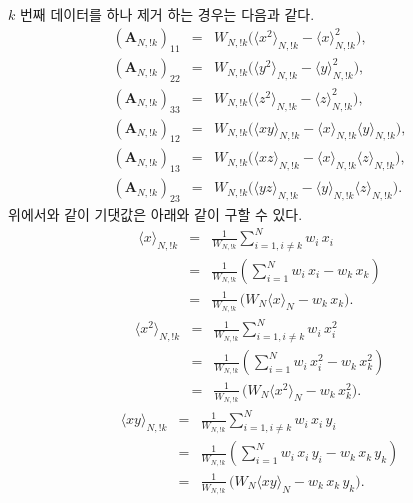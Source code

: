 \documentclass[chapter,a4paper,10pt]{oblivoir}
\begin{document}
$k$ 번째 데이터를 하나 제거 하는 경우는 다음과 같다.
\begin{eqnarray}
\left(\mathbf{A}_{N,!k}\right)_{11} &=& W_{N,!k}\Big(\langle x^2 \rangle_{N,!k} -\langle x \rangle_{N,!k}^2\Big), \\
\left(\mathbf{A}_{N,!k}\right)_{22} &=& W_{N,!k}\Big(\langle y^2 \rangle_{N,!k} -\langle y \rangle_{N,!k}^2\Big), \\
\left(\mathbf{A}_{N,!k}\right)_{33} &=& W_{N,!k}\Big(\langle z^2 \rangle_{N,!k} -\langle z \rangle_{N,!k}^2\Big), \\
\left(\mathbf{A}_{N,!k}\right)_{12} &=& W_{N,!k} \Big(\langle xy \rangle_{N,!k} -\langle x \rangle_{N,!k}\langle y \rangle_{N,!k}\Big), \\
\left(\mathbf{A}_{N,!k}\right)_{13} &=& W_{N,!k} \Big(\langle xz \rangle_{N,!k} -\langle x \rangle_{N,!k}\langle z \rangle_{N,!k}\Big), \\
\left(\mathbf{A}_{N,!k}\right)_{23} &=& W_{N,!k} \Big(\langle yz \rangle_{N,!k} -\langle y \rangle_{N,!k}\langle z \rangle_{N,!k}\Big).
\end{eqnarray}
위에서와 같이 기댓값은 아래와 같이 구할 수 있다.
\begin{eqnarray}
\langle x \rangle_{N,!k} &=& \frac{1}{W_{N,!k}}\sum_{i=1, i\neq k}^{N}w_i\,x_i \\
&=& \frac{1}{W_{N,!k}}\left(\sum_{i=1}^{N}w_i\,x_i - w_{k}\,x_{k}\right)\nonumber\\
&=& \frac{1}{W_{N,!k}}\,\Big(W_N\langle x \rangle_N - w_{k}\,x_{k}\Big).\nonumber
\end{eqnarray}
\begin{eqnarray}
\langle x^2 \rangle_{N,!k} &=& \frac{1}{W_{N,!k}}\sum_{i=1, i\neq k}^{N}w_i\,x_i^2 \\
&=& \frac{1}{W_{N,!k}}\left(\sum_{i=1}^{N}w_i\,x_i^2 - w_{k}\,x_{k}^2\right)\nonumber\\
&=& \frac{1}{W_{N,!k}}\,\Big(W_N\langle x^2 \rangle_N - w_{k}\,x_{k}^2\Big).\nonumber
\end{eqnarray}
\begin{eqnarray}
\langle xy \rangle_{N,!k} &=& \frac{1}{W_{N,!k}}\sum_{i=1, i\neq k}^{N}w_i\,x_i\,y_i \\
&=& \frac{1}{W_{N,!k}}\left(\sum_{i=1}^{N}w_i\,x_i\,y_i - w_{k}\,x_{k}\,y_{k}\right)\nonumber\\
&=& \frac{1}{W_{N,!k}}\,\Big(W_N\langle xy \rangle_N - w_{k}\,x_{k}\,y_{k}\Big).\nonumber
\end{eqnarray}
\end{document}
